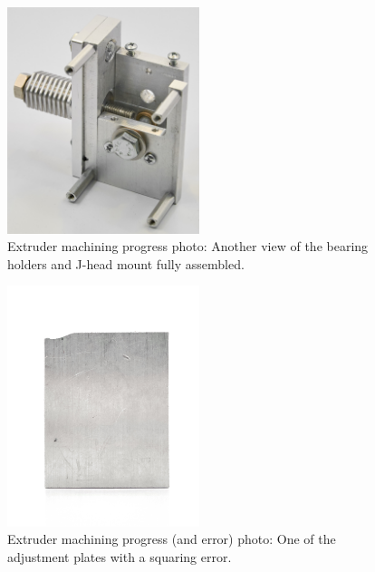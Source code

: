 \begin{figure}[h!]
\centering
\includegraphics[width=0.5\textwidth]{./figures/extruder-progress-4}
\caption{Extruder machining progress photo: Another view of the bearing holders and J-head mount fully assembled.}
\label{fig:extruder-progress-4}
\end{figure}


\begin{figure}[h!]
\centering
\includegraphics[width=0.5\textwidth]{./figures/extruder-mistake-1}
\caption{Extruder machining progress (and error) photo: One of the adjustment plates with a squaring error.}
\label{fig:extruder-mistake-1}
\end{figure}

